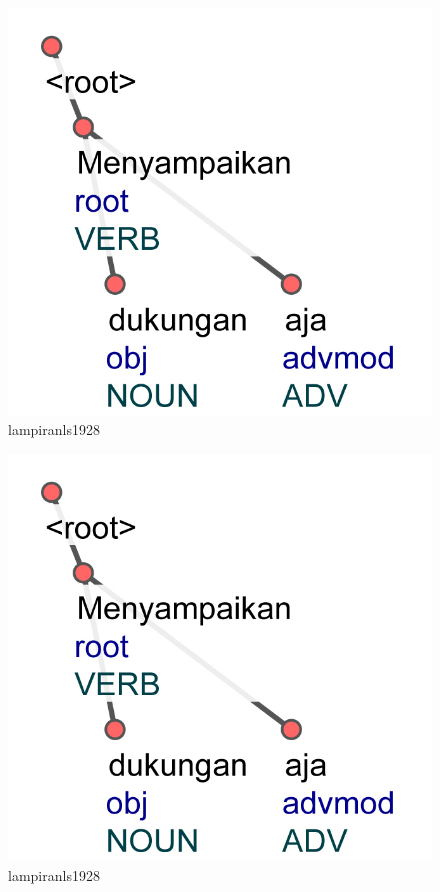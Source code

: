 \begin{figure}
	\centering \includegraphics[width=0.8
	\textwidth] {pics/lampiranls1928.jpg} 
	\caption{lampiranls1928} 
	\label{fig:lampiranls1928} 
\end{figure}

\begin{figure}
	\centering \includegraphics[width=0.8
	\textwidth] {pics/lampiranls1928.jpg} 
	\caption{lampiranls1928} 
	\label{fig:lampiranls1928} 
\end{figure}
